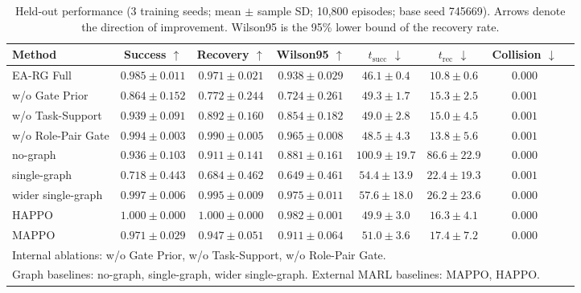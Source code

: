\begin{table}[t]
\centering
\small
\setlength{\tabcolsep}{4pt}
\caption{Held-out performance (3 training seeds; mean $\pm$ sample SD; 10{,}800 episodes; base seed 745669). Arrows denote the direction of improvement. Wilson95 is the 95\% lower bound of the recovery rate.}
\label{tab:held_out}
\begin{tabular}{lccccccc}
\toprule
Method & Success $\uparrow$ & Recovery $\uparrow$ & Wilson95 $\uparrow$ & $t_{\mathrm{succ}}$ $\downarrow$ & $t_{\mathrm{rec}}$ $\downarrow$ & Collision $\downarrow$ \\
\midrule
EA-RG Full & $0.985 \pm 0.011$ & $0.971 \pm 0.021$ & $0.938 \pm 0.029$ & $46.1 \pm 0.4$ & $10.8 \pm 0.6$ & $0.000$ \\
w/o Gate Prior & $0.864 \pm 0.152$ & $0.772 \pm 0.244$ & $0.724 \pm 0.261$ & $49.3 \pm 1.7$ & $15.3 \pm 2.5$ & $0.001$ \\
w/o Task-Support & $0.939 \pm 0.091$ & $0.892 \pm 0.160$ & $0.854 \pm 0.182$ & $49.0 \pm 2.8$ & $15.0 \pm 4.5$ & $0.001$ \\
w/o Role-Pair Gate & $0.994 \pm 0.003$ & $0.990 \pm 0.005$ & $0.965 \pm 0.008$ & $48.5 \pm 4.3$ & $13.8 \pm 5.6$ & $0.001$ \\
no-graph & $0.936 \pm 0.103$ & $0.911 \pm 0.141$ & $0.881 \pm 0.161$ & $100.9 \pm 19.7$ & $86.6 \pm 22.9$ & $0.000$ \\
single-graph & $0.718 \pm 0.443$ & $0.684 \pm 0.462$ & $0.649 \pm 0.461$ & $54.4 \pm 13.9$ & $22.4 \pm 19.3$ & $0.001$ \\
wider single-graph & $0.997 \pm 0.006$ & $0.995 \pm 0.009$ & $0.975 \pm 0.011$ & $57.6 \pm 18.0$ & $26.2 \pm 23.6$ & $0.000$ \\
HAPPO & $1.000 \pm 0.000$ & $1.000 \pm 0.000$ & $0.982 \pm 0.001$ & $49.9 \pm 3.0$ & $16.3 \pm 4.1$ & $0.000$ \\
MAPPO & $0.971 \pm 0.029$ & $0.947 \pm 0.051$ & $0.911 \pm 0.064$ & $51.0 \pm 3.6$ & $17.4 \pm 7.2$ & $0.000$ \\
\midrule
\multicolumn{7}{l}{\footnotesize Internal ablations: w/o Gate Prior, w/o Task-Support, w/o Role-Pair Gate.} \\
\multicolumn{7}{l}{\footnotesize Graph baselines: no-graph, single-graph, wider single-graph. External MARL baselines: MAPPO, HAPPO.} \\
\bottomrule
\end{tabular}
\end{table}